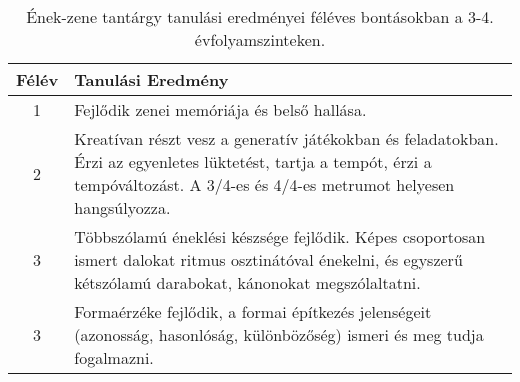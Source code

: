        
           \begin{longtable}{c | p{} }
            \caption[Ének-zene 3-4.]{Ének-zene tantárgy tanulási eredményei féléves bontásokban a 3-4. évfolyamszinteken. }  \\

            \textbf{Félév} & \textbf{Tanulási Eredmény} \\
            \hline
            \endhead
                                
                                          1 &  Fejlődik zenei memóriája és belső hallása. \\ \hline
                                      
                                
                                          2 &  Kreatívan részt vesz a generatív játékokban és feladatokban. Érzi az egyenletes lüktetést, tartja a tempót, érzi a tempóváltozást. A 3/4-es és 4/4-es metrumot helyesen hangsúlyozza. \\ \hline
                                      
                                
                                          3 &  Többszólamú éneklési készsége fejlődik. Képes csoportosan ismert dalokat ritmus osztinátóval énekelni, és egyszerű kétszólamú darabokat, kánonokat megszólaltatni. \\ \hline
                                          3 &  Formaérzéke fejlődik, a formai építkezés jelenségeit (azonosság, hasonlóság, különbözőség) ismeri és meg tudja fogalmazni. \\ \hline
                                      

\end{longtable}
